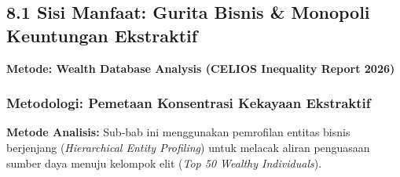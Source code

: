 \documentclass[
]{article}
\begin{document}
\subsection{8.1 Sisi Manfaat: Gurita Bisnis \& Monopoli Keuntungan
Ekstraktif}\label{sisi-manfaat-gurita-bisnis-monopoli-keuntungan-ekstraktif}

\textbf{Metode: Wealth Database Analysis (CELIOS Inequality Report
2026)}

\subsubsection{Metodologi: Pemetaan Konsentrasi Kekayaan
Ekstraktif}\label{metodologi-pemetaan-konsentrasi-kekayaan-ekstraktif}

\textbf{Metode Analisis:} Sub-bab ini menggunakan pemrofilan entitas
bisnis berjenjang (\emph{Hierarchical Entity Profiling}) untuk melacak
aliran penguasaan sumber daya menuju kelompok elit (\emph{Top 50 Wealthy
Individuals}).
\end{document}
